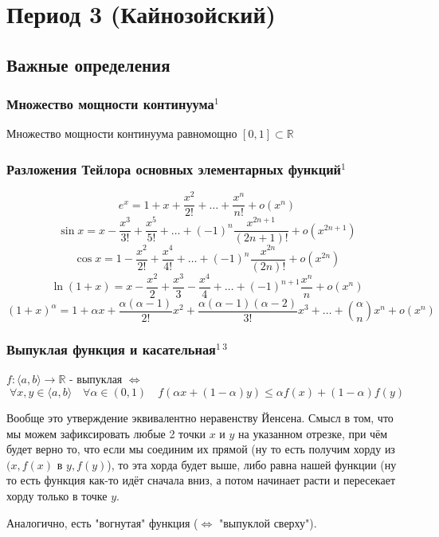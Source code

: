 \documentclass{article}
\begin{document}
\section{Период 3 (Кайнозойский)}
\subsection{Важные определения}

\subsubsection{Множество мощности континуума\texorpdfstring{$^1$}{}}
Множество мощности континуума равномощно $[0, 1] \subset \mathbb{R}$


\subsubsection{Разложения Тейлора основных элементарных функций\texorpdfstring{$^1$}{}}
$$
e^x = 1 + x + \frac{x^2}{2!}+\ldots+\frac{x^n}{n!}+o(x^n)
$$
$$
\sin{x} = x - \frac{x^3}{3!} + \frac{x^5}{5!} + \ldots + (-1)^n\frac{x^{2n+1}}{(2n+1)!} + o(x^{2n+1})
$$
$$
\cos{x} = 1 - \frac{x^2}{2!} + \frac{x^4}{4!} + \ldots + (-1)^n\frac{x^{2n}}{(2n)!} + o(x^{2n})
$$
$$
\ln{(1 + x)} = x - \frac{x^2}{2} + \frac{x^3}{3} - \frac{x^4}{4} + \ldots + (-1)^{n+1}\frac{x^n}{n} + o(x^n)
$$
$$
(1+x)^\alpha = 1 + \alpha x + \frac{\alpha (\alpha - 1)}{2!}x^2 + \frac{\alpha(\alpha-1)(\alpha-2)}{3!}x^3 + \ldots + \binom{\alpha}{n}x^n + o(x^n)
$$


\subsubsection{Выпуклая функция и касательная\texorpdfstring{$^{1 \ 3}$}{}}
$f : \langle a, b\rangle \rightarrow \mathbb{R}$ - выпуклая $\Leftrightarrow$
$$
\forall x, y \in \langle a, b \rangle \quad \forall \alpha \in (0, 1) \quad f(\alpha x + (1-\alpha)y) \le \alpha f(x)+(1-\alpha) f(y)
$$

Вообще это утверждение эквивалентно неравенству Йенсена. Смысл в том, что мы можем зафиксировать любые 2 точки $x$ и $y$ на указанном отрезке, при чём будет верно то, что если мы соединим их прямой (ну то есть получим хорду из $(x, f(x)$ в $y, f(y)$), то эта хорда будет выше, либо равна нашей функции (ну то есть функция как-то идёт сначала вниз, а потом начинает расти и пересекает хорду только в точке $y$. 

Аналогично, есть "вогнутая" функция ($\Leftrightarrow$ "выпуклой сверху").
\end{document}
